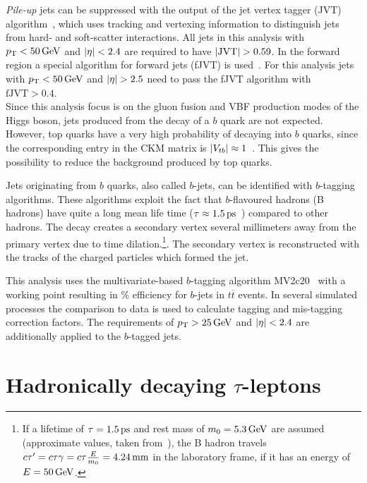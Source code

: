 \emph{Pile-up} jets can be suppressed with the output of the jet vertex tagger (JVT) algorithm~\cite{PERF-2014-03}, which
uses tracking and vertexing information to distinguish jets from hard- and soft-scatter interactions.
All jets in this analysis with $\pt < \unit[50]{GeV}$ and $\left|\eta\right| < 2.4$ are required to have $\left|\text{JVT}\right| > 0.59$.
In the forward region a special algorithm for forward jets (fJVT) is used~\cite{ATL-PHYS-PUB-2015-034}.
For this analysis jets with $\pt < \unit[50]{GeV}$ and $\left|\eta\right| > 2.5$ need to pass the fJVT algorithm with
$\text{fJVT} > 0.4$.
\\[\baselineskip]
Since this analysis focus is on the gluon fusion and VBF production modes of the Higgs boson, jets produced from
the decay of a $b$ quark are not expected. However, top quarks have a very high probability of decaying into $b$ quarks,
since the corresponding entry in the CKM matrix is $\left|V_{tb}\right| \approx 1$~\cite{PDG}.
This gives the possibility to reduce the background produced by top quarks.

Jets originating from $b$ quarks, also called $b$-jets, can be identified with $b$-tagging algorithms.
These algorithms exploit the fact that $b$-flavoured hadrons (B hadrons) have quite a long mean life time
($\tau \approx \unit[1.5]{ps}$~\cite{PDG}) compared to other hadrons.
The decay creates a secondary vertex several millimeters away from the primary vertex due to time
dilation.\footnote{If a lifetime of $\tau = \unit[1.5]{ps}$ and rest mass of $m_0 = \unit[5.3]{GeV}$ are assumed (approximate values, taken from~\cite{PDG}),
the B hadron travels $c\tau' = c \tau \gamma = c \tau \frac{E}{m_0} = \unit[4.24]{mm}$ in the laboratory frame, if it has an energy of $E = \unit[50]{GeV}$.}.
The secondary vertex is reconstructed with the tracks of the charged particles which formed the jet.

This analysis uses the multivariate-based $b$-tagging algorithm MV2c20~\cite{PERF-2012-04,ATL-PHYS-PUB-2016-012} with
a working point resulting in \unit[85]{\%} efficiency for $b$-jets in $t\overline{t}$ events. In several simulated processes
the comparison to data is used to calculate tagging and mis-tagging correction factors.
The requirements of $\pt > \unit[25]{GeV}$ and $\left|\eta\right| < 2.4$ are additionally applied to the $b$-tagged jets.



\section{Hadronically decaying  $\tau$-leptons}\label{sec:object_selection:tau_leptons}


